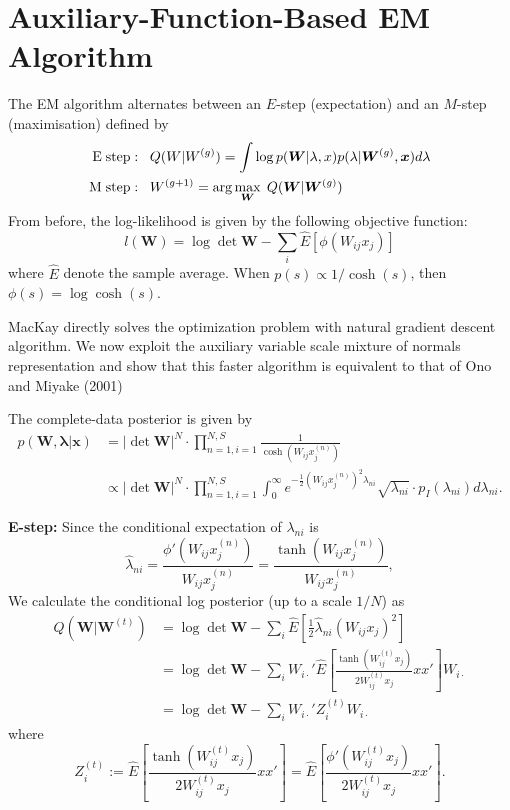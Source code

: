 \documentclass[11pt]{article}%
\begin{document}
\section{Auxiliary-Function-Based EM Algorithm}

The EM algorithm alternates between an $E$-step (expectation) and an $M$-step (maximisation) defined by 
\begin{align*}
{\rm E \; step} & :   \; \; Q(W|W^{(g)})   = \int \log p(\bm W|\lambda,x) p(\lambda | \bm W^{(g)}, \bm x) d\lambda \\
{\rm M \; step} & : \; \; W^{(g+1)}   = \arg\max_{\bm W} \; Q( \bm W| \bm W^{(g)}  ) 
\end{align*} 
From before, the log-likelihood is given by  the following objective function:
\begin{equation}\label{obj}
	l (\bm W) = \log\det \bm W - \sum_i \hat E\left[\phi \left(W_{ij}x_j\right)\right] 
\end{equation}
where $\hat{E}$ denote the sample average. 
When $p(s) \propto 1/\cosh(s)$, then  $\phi(s) = \log\cosh(s)$. 

MacKay directly solves the optimization problem with natural gradient descent algorithm. 
We now exploit the auxiliary variable scale mixture of normals representation and show that this faster algorithm is equivalent to that of  Ono and Miyake (2001)

The complete-data posterior is given by 
\begin{align*}
	p(\bm W, \bm  \lambda | \bm x) &= |\det\bm W|^N \cdot \prod_{n=1,i=1}^{N,S}  \frac{1}{\cosh\left(W_{ij}x_j^{(n)}\right)} \\
	&\propto |\det\bm W|^N \cdot \prod_{n=1,i=1}^{N,S}  \int_{0}^\infty e^{-\frac{1}{2}\left(W_{ij}x_j^{(n)}\right)^2\lambda_{ni}} \sqrt{\lambda_{ni}}\cdot p_I(\lambda_{ni}) 
	d\lambda_{ni} .
\end{align*}
\vspace{0.1in}

\noindent  \textbf{E-step:} 
	Since the conditional expectation of $\lambda_{ni}$ is 
	$$
	\hat\lambda_{ni} = \frac{\phi'\left(W_{ij}x_j^{(n)}\right)}{W_{ij}x_j^{(n)}} = \frac{\tanh\left(W_{ij}x_j^{(n)}\right)}{W_{ij}x_j^{(n)}},
	$$
	We calculate the conditional log posterior (up to a scale $1/N$) as 
	\begin{align}
		Q(\bm W | \bm W^{(t)}) &= \log\det \bm W - \sum_i \hat{E}\left[\frac{1}{2}\hat\lambda_{ni}\left(W_{ij}x_j\right)^2\right]\\
		&=\log\det \bm W - \sum_i W_{i\cdot}'\hat{E}\left[\frac{\tanh\left(W_{ij}^{(t)}x_j\right)}{2W_{ij}^{(t)}x_j} xx'\right]W_{i\cdot}\\
		&= \log\det \bm W - \sum_i W_{i\cdot}'Z_i^{(t)}W_{i\cdot}
	\end{align}
	where 
	$$Z_i^{(t)} := \hat{E}\left[\frac{\tanh\left(W_{ij}^{(t)}x_j\right)}{2W_{ij}^{(t)}x_j} xx'\right] = \hat{E}\left[\frac{\phi'\left(W_{ij}^{(t)}x_j\right)}{2W_{ij}^{(t)}x_j} xx'\right]. $$
\end{document}
